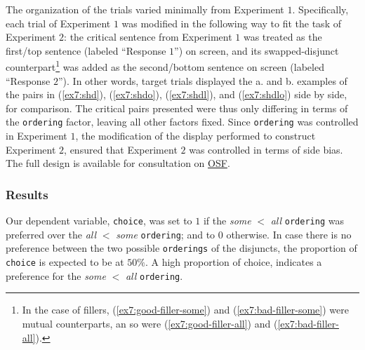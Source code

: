 The organization of the trials varied minimally from Experiment $1$. Specifically, each trial of Experiment $1$ was modified in the following way to fit the task of Experiment $2$: the critical sentence from Experiment $1$ was treated as the first/top sentence (labeled ``Response $1$'') on screen, and its swapped-disjunct counterpart\footnote{In the case of fillers, (\ref{ex7:good-filler-some}) and (\ref{ex7:bad-filler-some}) were mutual counterparts, an so were (\ref{ex7:good-filler-all}) and (\ref{ex7:bad-filler-all}).} was added as the second/bottom sentence on screen (labeled ``Response $2$''). In other words, target trials displayed the a. and b. examples of the pairs in (\ref{ex7:shd}), (\ref{ex7:shdo}), (\ref{ex7:shdl}), and (\ref{ex7:shdlo}) side by side, for comparison. The critical pairs presented were thus only differing in terms of the \texttt{ordering} factor, leaving all other factors fixed. Since \texttt{ordering} was controlled in Experiment $1$, the modification of the display performed to construct Experiment $2$, ensured that Experiment $2$ was controlled in terms of side bias.  The full design is available for consultation on \href{https://osf.io/kn692}{OSF}.



\subsubsection{Results}

Our dependent variable, \texttt{choice}, was set to $1$ if the \textit{some} $<$ \textit{all} \texttt{ordering} was preferred over the \textit{all} $<$ \textit{some} \texttt{ordering}; and to $0$ otherwise. In case there is no preference between the two possible \texttt{orderings} of the disjuncts, the proportion of \texttt{choice} is expected to be at $50\%$. A high proportion of choice, indicates a preference for the \textit{some} $<$ \textit{all} \texttt{ordering}.\\

